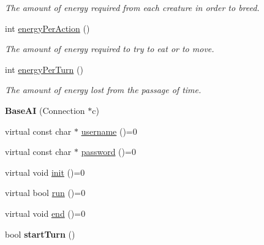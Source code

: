 \begin{DoxyCompactItemize}
\begin{DoxyCompactList}\small\item\em \-The amount of energy required from each creature in order to breed. \end{DoxyCompactList}\item 
\hypertarget{classBaseAI_a79bbd61ff38bd0430bc22c852c3cabb8}{int \hyperlink{classBaseAI_a79bbd61ff38bd0430bc22c852c3cabb8}{energy\-Per\-Action} ()}\label{classBaseAI_a79bbd61ff38bd0430bc22c852c3cabb8}

\begin{DoxyCompactList}\small\item\em \-The amount of energy required to try to eat or to move. \end{DoxyCompactList}\item 
\hypertarget{classBaseAI_ac8abbaaa98a16af78ade9a88b2e60e72}{int \hyperlink{classBaseAI_ac8abbaaa98a16af78ade9a88b2e60e72}{energy\-Per\-Turn} ()}\label{classBaseAI_ac8abbaaa98a16af78ade9a88b2e60e72}

\begin{DoxyCompactList}\small\item\em \-The amount of energy lost from the passage of time. \end{DoxyCompactList}\item 
\hypertarget{classBaseAI_a3f2806936e6e65d76218e04b057e05f4}{{\bfseries \-Base\-A\-I} (\-Connection $\ast$c)}\label{classBaseAI_a3f2806936e6e65d76218e04b057e05f4}

\item 
virtual const char $\ast$ \hyperlink{classBaseAI_aef082fbf306fec04515ed5ed3b1ba582}{username} ()=0
\item 
virtual const char $\ast$ \hyperlink{classBaseAI_a9251e20447917cda64ad1487b903456f}{password} ()=0
\item 
virtual void \hyperlink{classBaseAI_a90ce8becd6f2e32c2cc32d41145e88df}{init} ()=0
\item 
virtual bool \hyperlink{classBaseAI_ad60148e7e9e450ce47432b07b4db1ed6}{run} ()=0
\item 
virtual void \hyperlink{classBaseAI_a60c8246a859ba2dba84b70239bc129bc}{end} ()=0
\item 
\hypertarget{classBaseAI_ac6303df0fece47e29b77dd0aa0aa4fe8}{bool {\bfseries start\-Turn} ()}\label{classBaseAI_ac6303df0fece47e29b77dd0aa0aa4fe8}

\end{DoxyCompactItemize}
